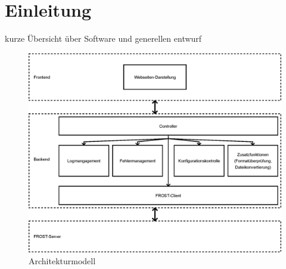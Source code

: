 \section{Einleitung}

kurze Übersicht über Software und generellen entwurf

\begin{figure}[htbp]
\centering
\includegraphics[scale=0.6]{images/architektur.eps}
\caption{\label{fig:architektur} Architekturmodell}
\end{figure}